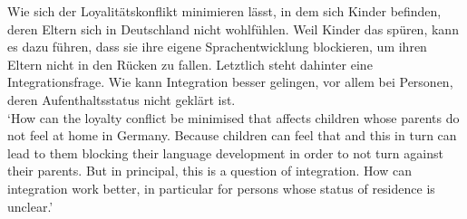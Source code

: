 \documentclass[output=paper,colorlinks,citecolor=brown]{langscibook}
\begin{document}
\ea\label{ex:04:4}
Wie sich der Loyalitätskonflikt minimieren lässt, in dem sich Kinder befinden, deren Eltern sich in Deutschland nicht wohlfühlen. Weil Kinder das spüren, kann es dazu führen, dass sie ihre eigene Sprachentwicklung blockieren, um ihren Eltern nicht in den Rücken zu fallen. Letztlich steht dahinter eine Integrationsfrage. Wie kann Integration besser gelingen, vor allem bei Personen, deren Aufenthaltsstatus nicht geklärt ist.\\
  
\trans `How can the loyalty conflict be minimised that affects children whose parents do not feel at home in Germany. Because children can feel that and this in turn can lead to them blocking their language development in order to not turn against their parents. But in principal, this is a question of integration. How can integration work better, in particular for persons whose status of residence is unclear.'
\z
\end{document}
